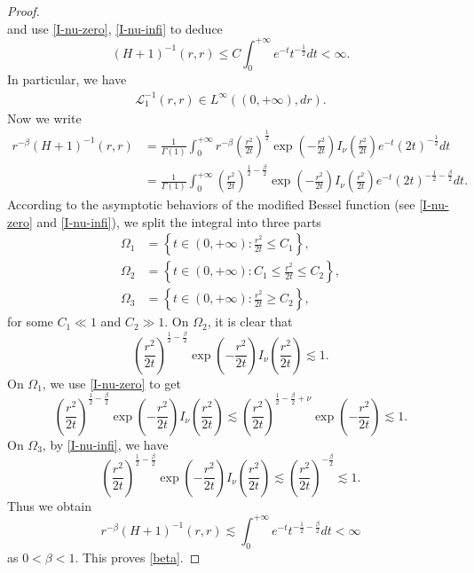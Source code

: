 \documentclass[%
11pt,  reqno]{amsart}
\theoremstyle{remarkstyle}
\newcommand{\1}{\hspace{0.2mm}\text{I}\hspace{0.2mm}}
\renewcommand{\L}{\mathcal{L}}
\numberwithin{equation}{section}
\numberwithin{theorem}{section}
\begin{document}
\begin{proof}
\[		\]
		and use \eqref{I-nu-zero}, \eqref{I-nu-infi} to deduce
		\[
		(H+1)^{-1}(r,r) \leq C \int_0^{+\infty} e^{-t} t^{-\frac{1}{2}}dt <\infty.
		\]
		In particular, we have
		\begin{align} \label{L-infty}
			\L_1^{-1}(r,r) \in L^\infty((0,+\infty),dr).
		\end{align}
		Now we write
		\begin{align*}
			r^{-\beta} (H+1)^{-1}(r,r) &= \frac{1}{\Gamma(1)} \int_0^{+\infty} r^{-\beta} 
			\left(\frac{r^2}{2t}\right)^{\frac{1}{2}} \exp\left(-\frac{r^2}{2t}\right) I_\nu\left(\frac{r^2}{2t}\right) e^{-t} (2t)^{-\frac{1}{2}}dt \\
			&=\frac{1}{\Gamma(1)} \int_0^{+\infty} \left(\frac{r^2}{2t}\right)^{\frac{1}{2}-\frac{\beta}{2}} \exp\left(-\frac{r^2}{2t}\right) I_\nu\left(\frac{r^2}{2t}\right) e^{-t} (2t)^{-\frac{1}{2}-\frac{\beta}{2}}dt.
		\end{align*}
		According to the asymptotic behaviors of the modified Bessel function (see \eqref{I-nu-zero} and \eqref{I-nu-infi}), we split the integral into three parts
		\begin{align*}
			\Omega_1 &= \left\{t \in (0,+\infty) : \frac{r^2}{2t} \leq C_1 \right\}, \\
			\Omega_2 &= \left\{t\in (0,+\infty) : C_1 \leq \frac{r^2}{2t} \leq C_2 \right\}, \\
			\Omega_3 &= \left\{t \in (0,+\infty) : \frac{r^2}{2t} \geq C_2\right\},
		\end{align*}
		for some $C_1 \ll 1$ and $C_2 \gg 1$. On $\Omega_2$, it is clear that
		\[
		\left(\frac{r^2}{2t}\right)^{\frac{1}{2}-\frac{\beta}{2}} \exp\left(-\frac{r^2}{2t}\right) I_\nu\left(\frac{r^2}{2t}\right) \lesssim 1.
		\]
		On $\Omega_1$, we use \eqref{I-nu-zero} to get
		\[
		\left(\frac{r^2}{2t}\right)^{\frac{1}{2}-\frac{\beta}{2}} \exp\left(-\frac{r^2}{2t}\right) I_\nu\left(\frac{r^2}{2t}\right) \lesssim \left(\frac{r^2}{2t}\right)^{\frac{1}{2}-\frac{\beta}{2}+\nu} \exp\left(-\frac{r^2}{2t}\right) \lesssim 1.
		\]
		On $\Omega_3$, by \eqref{I-nu-infi}, we have
		\[
		\left(\frac{r^2}{2t}\right)^{\frac{1}{2}-\frac{\beta}{2}} \exp\left(-\frac{r^2}{2t}\right) I_\nu\left(\frac{r^2}{2t}\right) \lesssim \left(\frac{r^2}{2t}\right)^{-\frac{\beta}{2}} \lesssim 1.  
		\]
		Thus we obtain
		\[
		r^{-\beta} (H+1)^{-1}(r,r)\lesssim \int_0^{+\infty} e^{-t} t^{-\frac{1}{2}-\frac{\beta}{2}}dt <\infty
		\]
		as $0<\beta<1$. This proves \eqref{beta}.
		

\end{proof}
\end{document}

